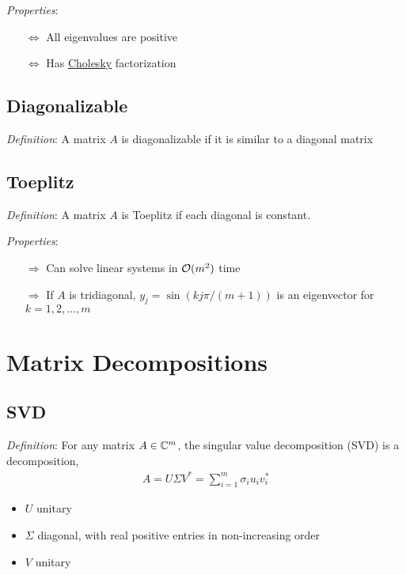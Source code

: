 \documentclass[12pt]{article}
\begin{document}
\textit{Properties}:
\begin{itemize}[nolistsep]
    \item[\(\Leftrightarrow\)] All eigenvalues are positive
    \item[\(\Leftrightarrow\)] Has \hyperref[sec:cholesky]{Cholesky} factorization
\end{itemize}

\subsection{Diagonalizable}
\textit{Definition}: A matrix \( A \) is diagonalizable if it is similar to a diagonal matrix


\subsection{Toeplitz}
\textit{Definition}: A matrix \( A \) is Toeplitz if each diagonal is constant.

\textit{Properties}:
\begin{itemize}[nolistsep]
    \item[\(\Rightarrow\)] Can solve linear systems in \( \mathcal{O}(m^2) \) time
    \item[\(\Rightarrow\)] If \( A \) is tridiagonal, \( y_j = \sin(k j \pi / (m+1)) \) is an eigenvector for \( k=1,2,\ldots, m \)
\end{itemize}



\pagebreak
\section{Matrix Decompositions}

\subsection{SVD}
\textit{Definition}: For any matrix \( A\in\mathbb{C}^m \), the singular value decomposition (SVD) is a decomposition,
\begin{align*}
    A = U\Sigma V^* = \sum_{i=1}^{m} \sigma_i u_iv_i^*
\end{align*}
\begin{itemize}[nolistsep]
    \item \( U \) unitary
    \item \( \Sigma \) diagonal, with real positive entries in non-increasing order
    \item \( V \) unitary
\end{itemize}
\end{document}
